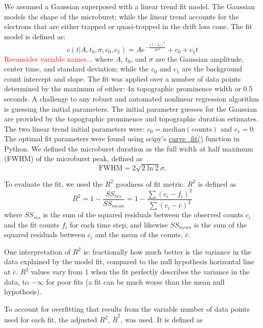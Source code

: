 \documentclass[draft]{agujournal2019}
\begin{document}
We assumed a Gaussian superposed with a linear trend fit model. The Gaussian models the shape of the microburst; while the linear trend accounts for the electrons that are either trapped or quasi-trapped in the drift loss cone. The fit model is defined as:
\begin{equation}
c(t | A, t_0, \sigma, c_0, c_1) = A e^{-\frac{(t-t_0)^2}{2\sigma^2}} + c_0 + c_1 t
\end{equation} \textcolor{red}{Reconsider variable names...} where $A$, $t_0$, and $\sigma$ are the Gaussian amplitude, center time, and standard deviation; while the $c_0$ and $c_1$ are the background count intercept and slope. The fit was applied over a number of data points determined by the maximum of either: 4x topographic prominence width or 0.5 seconds. A challenge to any robust and automated nonlinear regression algorithm is guessing the initial parameters. The initial parameter guesses for the Gaussian are provided by the topographic prominence and topographic duration estimates. The two linear trend initial parameters were: $c_0=\mathrm{median(counts)}$ and $c_1=0$. The optimal fit parameters were found using scipy's \url{curve_fit()} function in Python. We defined the microburst duration as the full width at half maximum (FWHM) of the microburst peak, defined as
\begin{equation}
\mathrm{FWHM} = 2\sqrt{2 \ln{2}} \sigma.
\end{equation}

To evaluate the fit, we used the $R^2$ goodness of fit metric. $R^2$ is defined as
\begin{equation}
R^2 = 1 - \frac{SS_{res}}{SS_{mean}} = 1 - \frac{\sum{(c_i-f_i)^2}}{\sum{(c_i-\bar{c})^2}}
\end{equation} where $SS_{res}$ is the sum of the squared residuals between the observed counts $c_i$ and the fit counts $f_i$ for each time step, and likewise $SS_{mean}$ is the sum of the squared residuals between $c_i$ and the mean of the counts, $\bar{c}$.

One interpretation of $R^2$ is: fractionally how much better is the variance in the data explained by the model fit, compared to the null hypothesis horizontal line at $\bar{c}$. $R^2$ values vary from $1$ when the fit perfectly describes the variance in the data, to $-\infty$ for poor fits (a fit can be much worse than the mean null hypothesis).

To account for overfitting that results from the variable number of data points used for each fit, the adjusted $R^2$, $\bar{R}^2$, was used. It is defined as
\end{document}
